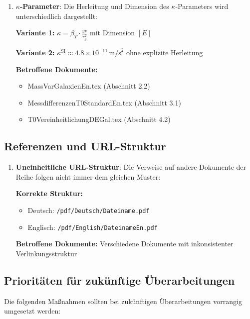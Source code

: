 \documentclass[12pt,a4paper]{article}
\begin{document}
	\begin{enumerate}[label=\textbf{P\arabic*.},resume]
		\item \textbf{$\kappa$-Parameter}: Die Herleitung und Dimension des $\kappa$-Parameters wird unterschiedlich dargestellt:
		
		\textbf{Variante 1:} $\kappa = \beta_T \cdot \frac{yv}{r_g^2}$ mit Dimension $[E]$
		
		\textbf{Variante 2:} $\kappa^{\text{SI}} \approx 4.8 \times 10^{-11} \, \text{m/s}^2$ ohne explizite Herleitung
		
		\textbf{Betroffene Dokumente:}
		\begin{itemize}
			\item MassVarGalaxienEn.tex (Abschnitt 2.2)
			\item MessdifferenzenT0StandardEn.tex (Abschnitt 3.1)
			\item T0VereinheitlichungDEGal.tex (Abschnitt 4.2)
		\end{itemize}
	\end{enumerate}
	
	\subsection{Referenzen und URL-Struktur}
	
	\begin{enumerate}[label=\textbf{P\arabic*.},resume]
		\item \textbf{Uneinheitliche URL-Struktur}: Die Verweise auf andere Dokumente der Reihe folgen nicht immer dem gleichen Muster:
		
		\textbf{Korrekte Struktur:}
		\begin{itemize}
			\item Deutsch: \texttt{/pdf/Deutsch/Dateiname.pdf}
			\item Englisch: \texttt{/pdf/English/DateinameEn.pdf}
		\end{itemize}
		
		\textbf{Betroffene Dokumente:} Verschiedene Dokumente mit inkonsistenter Verlinkungsstruktur
	\end{enumerate}
	
	\subsection{Prioritäten für zukünftige Überarbeitungen}
	
	Die folgenden Maßnahmen sollten bei zukünftigen Überarbeitungen vorrangig umgesetzt werden:
	
\end{document}
